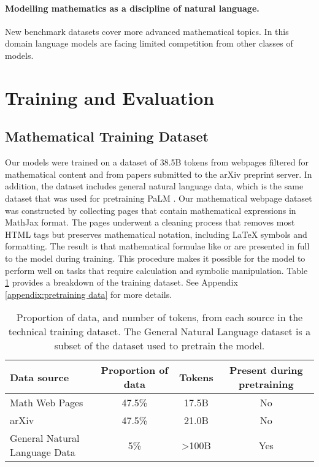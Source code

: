 \documentclass{article}
\newcommand{\pretrainedmodel}{{PaLM }}
\begin{document}
\paragraph{Modelling mathematics as a discipline of natural language.} New benchmark datasets \citep{MATH, naturalproof} cover more advanced mathematical topics. In this domain language models are facing limited competition from other classes of models.

\section{Training and Evaluation}
\subsection{Mathematical Training Dataset}
\label{sec:pretraining_data}

Our models were trained on a dataset of 38.5B tokens from webpages filtered for mathematical content and from papers submitted to the arXiv preprint server. In addition, the dataset includes general natural language data, which is the same dataset that was used for pretraining \pretrainedmodel\!\!. Our mathematical webpage dataset was constructed by collecting pages that contain mathematical expressions in MathJax format. The pages underwent a cleaning process that removes most HTML tags but preserves mathematical notation, including \LaTeX{} symbols and formatting. The result is that mathematical formulae like  or  are presented in full to the model during training.  This procedure makes it possible for the model to perform well on tasks that require calculation and symbolic manipulation.
Table \ref{table:dataset-mix} provides a breakdown of the training dataset.
See Appendix \ref{appendix:pretraining data} 
for more details.

\begin{table}[!ht]
\caption{\small Proportion of data, and number of tokens, from each source in the technical training dataset. The General Natural Language dataset is a subset of the dataset used to pretrain the model.}
\label{table:dataset-mix}
\begin{center}
\begin{tabular}{ lccc } 
\toprule
Data source & Proportion of data & Tokens & Present during pretraining    \\ 
\midrule
Math Web Pages & 47.5\% & 17.5B & No\\
arXiv    & 47.5\% & 21.0B   & No      \\ 
General Natural Language Data & 5\% & >100B & Yes \\ 
\bottomrule
\end{tabular}
\end{center}
\end{table}
\end{document}
